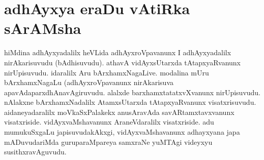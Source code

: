 \chapter{adhAyxya eraDu vAtiRka sArAMsha}



\centerline{}

\begin{artha}
hiMdina adhAyxyadalilx heVLida adhAyxroVpavanunx I adhAyxyadalilx nirAkarisuvudu (bAdhisuvudu). athavA vidAyxsUtarxda tAtapxyaRvanunx nirUpisuvudu. idaralilx Aru bArxhamxNagaLive. modalina mUru bArxhamxNagaLu (adhAyxroVpavanunx nirAkarisuva apavAdaparxdhAnavAgiruvudu. alalxde barxhamxtatatxvXvanunx nirUpisuvudu. nAlakxne bArxhamxNadalilx AtamxsUtarxda tAtapxyaRvanunx visatxrisuvudu. aidaneyadaralilx moVkaSxPalakekx anusAravAda savARtamxtavxvanunx visatxriside. vidAyxvaMshavanunx AraneVdaralilx visatxriside. adu mumukuSxgaLu japisuvudakAkxgi, vidAyxvaMshavanunx adhayxyana japa mADuvudariMda guruparaMpareya samxraNe yuMTAgi videyxyu susithxravAguvudu.
\end{artha}

\centerline{}


